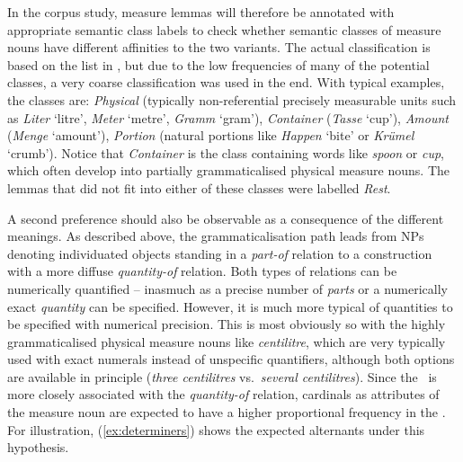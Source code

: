 In the corpus study, measure lemmas will therefore be annotated with appropriate semantic class labels to check whether semantic classes of measure nouns have different affinities to the two variants.
The actual classification is based on the list in \citet[530]{Koptjevskaja2001}, but due to the low frequencies of many of the potential classes, a very coarse classification was used in the end.
With typical examples, the classes are:
\textit{Physical} (typically non-referential precisely measurable units such as \textit{Liter} `litre', \textit{Meter} `metre', \textit{Gramm} `gram'),
\textit{Container} (\textit{Tasse} `cup'),
\textit{Amount} (\textit{Menge} `amount'), 
\textit{Portion} (natural portions like \textit{Happen} `bite' or \textit{Krümel} `crumb').
Notice that \textit{Container} is the class containing words like \textit{spoon} or \textit{cup}, which often develop into partially grammaticalised physical measure nouns.
The lemmas that did not fit into either of these classes were labelled \textit{Rest}.


A second preference should also be observable as a consequence of the different meanings.
As described above, the grammaticalisation path leads from NPs denoting individuated objects standing in a \textit{part-of} relation to a construction with a more diffuse \textit{quantity-of} relation.
Both types of relations can be numerically quantified -- inasmuch as a precise number of \textit{parts} or a numerically exact \textit{quantity} can be specified.
However, it is much more typical of quantities to be specified with numerical precision.
This is most obviously so with the highly grammaticalised physical measure nouns like \textit{centilitre}, which are very typically used with exact numerals instead of unspecific quantifiers, although both options are available in principle (\textit{three centilitres} vs.\ \textit{several centilitres}).
Since the \NACa\ is more closely associated with the \textit{quantity-of} relation, cardinals as attributes of the measure noun are expected to have a higher proportional frequency in the \NACa.
For illustration, (\ref{ex:determiners}) shows the expected alternants under this hypothesis.

\begin{exe}
  \ex\label{ex:determiners} 
  \begin{xlist}
  \end{xlist}
\end{exe}


